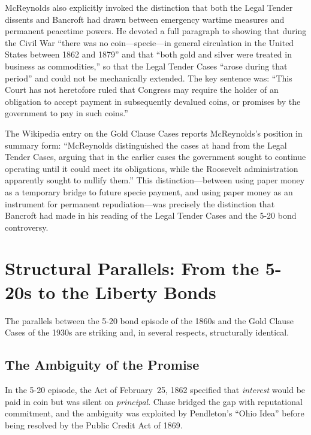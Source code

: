 \documentclass[12pt]{article}
\begin{document}
McReynolds also explicitly invoked the distinction that both the
Legal Tender dissents and Bancroft had drawn between emergency
wartime measures and permanent peacetime powers. He devoted a full
paragraph to showing that during the Civil War ``there was no coin---specie---in
general circulation in the United States between 1862 and 1879'' and
that ``both gold and silver were treated in business as commodities,''
so that the Legal Tender Cases ``arose during that period'' and could
not be mechanically extended. The key sentence was: ``This Court has
not heretofore ruled that Congress may require the holder of an
obligation to accept payment in subsequently devalued coins, or
promises by the government to pay in such coins.''

The Wikipedia entry on the Gold Clause Cases reports McReynolds's
position in summary form: ``McReynolds distinguished the cases at hand
from the Legal Tender Cases, arguing that in the earlier cases the
government sought to continue operating until it could meet its
obligations, while the Roosevelt administration apparently sought to
nullify them.'' This distinction---between using paper money as a
temporary bridge to future specie payment, and using paper money as an
instrument for permanent repudiation---was precisely the distinction
that Bancroft had made in his reading of the Legal Tender Cases and the
5-20 bond controversy.

\section{Structural Parallels: From the 5-20s to the Liberty Bonds}

The parallels between the 5-20 bond episode of the 1860s and the Gold
Clause Cases of the 1930s are striking and, in several respects,
structurally identical.

\subsection{The Ambiguity of the Promise}

In the 5-20 episode, the Act of February~25, 1862 specified that
\textit{interest} would be paid in coin but was silent on
\textit{principal}. Chase bridged the gap with reputational commitment,
and the ambiguity was exploited by Pendleton's ``Ohio Idea'' before
being resolved by the Public Credit Act of 1869.
\end{document}
